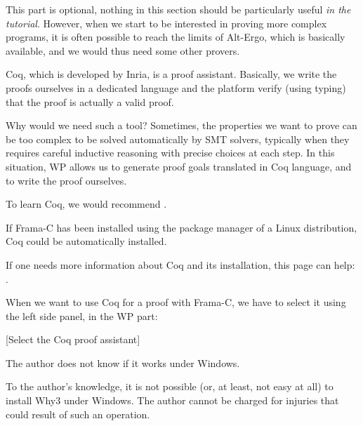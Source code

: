 \documentclass[middle]{zmdocument}
\begin{document}


This part is optional, nothing in this section should be particularly
useful \emph{in the tutorial}. However, when we start to be interested
in proving more complex programs, it is often possible to reach the
limits of Alt-Ergo, which is basically available, and we would thus need
some other provers.





Coq, which is developed by Inria, is a proof assistant. Basically, we
write the proofs ourselves in a dedicated language and the platform
verify (using typing) that the proof is actually a valid proof.



Why would we need such a tool? Sometimes, the properties we want to
prove can be too complex to be solved automatically by SMT solvers,
typically when they requires careful inductive reasoning with precise
choices at each step. In this situation, WP allows us to generate proof
goals translated in Coq language, and to write the proof ourselves.




To learn Coq, we would recommend
.



\begin{Information}
  If Frama-C has been installed using the package manager of a Linux
  distribution, Coq could be automatically installed.
\end{Information}


If one needs more information about Coq and its installation, this page
can help: .



When we want to use Coq for a proof with Frama-C, we have to select it
using the left side panel, in the WP part:



[Select the Coq proof assistant]


\begin{Information}
  The author does not know if it works under Windows.
\end{Information}




\begin{Warning}
  To the author's knowledge, it is not possible (or, at least, not easy
  at all) to install Why3 under Windows. The author cannot be charged for
  injuries that could result of such an operation.
\end{Warning}
\end{document}
